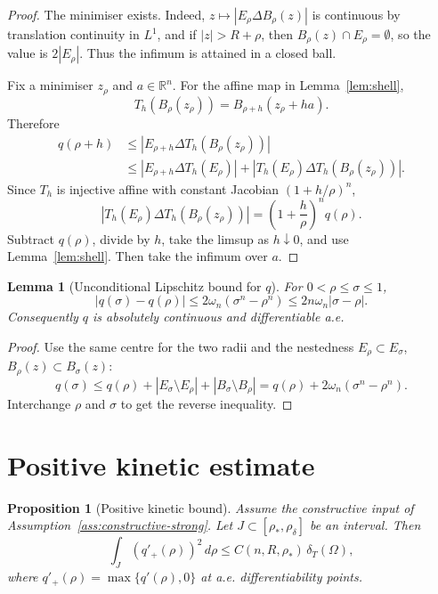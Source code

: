 \documentclass[11pt]{amsart}
\newtheorem{proposition}[theorem]{Proposition}
\newtheorem{lemma}[theorem]{Lemma}
\theoremstyle{definition}
\newcommand{\R}{\mathbb R}
\newcommand{\Om}{\Omega}
\newcommand{\dT}{\delta_T}
\newcommand{\rstar}{\rho_*}
\newcommand{\rdel}{\rho_\delta}
\begin{document}
\begin{proof}
The minimiser exists.  Indeed, \(z\mapsto |E_\rho\Delta B_\rho(z)|\) is
continuous by translation continuity in \(L^1\), and if
\(|z|>R+\rho\), then \(B_\rho(z)\cap E_\rho=\emptyset\), so the value is
\(2|E_\rho|\).  Thus the infimum is attained in a closed ball.

Fix a minimiser \(z_\rho\) and \(a\in\R^n\).  For the affine map in
Lemma~\ref{lem:shell},
\[
   T_h(B_\rho(z_\rho))=B_{\rho+h}(z_\rho+ha).
\]
Therefore
\[
\begin{aligned}
   q(\rho+h)
   &\le |E_{\rho+h}\Delta T_h(B_\rho(z_\rho))|\\
   &\le |E_{\rho+h}\Delta T_h(E_\rho)|
      +|T_h(E_\rho)\Delta T_h(B_\rho(z_\rho))|.
\end{aligned}
\]
Since \(T_h\) is injective affine with constant Jacobian
\((1+h/\rho)^n\),
\[
   |T_h(E_\rho)\Delta T_h(B_\rho(z_\rho))|
   =
   \left(1+\frac h\rho\right)^n q(\rho).
\]
Subtract \(q(\rho)\), divide by \(h\), take the limsup as \(h\downarrow0\),
and use Lemma~\ref{lem:shell}.  Then take the infimum over \(a\).
\end{proof}

\begin{lemma}[Unconditional Lipschitz bound for \(q\)]\label{lem:qLip}
For \(0<\rho\le\sigma\le1\),
\[
   |q(\sigma)-q(\rho)|
   \le 2\omega_n(\sigma^n-\rho^n)
   \le 2n\omega_n|\sigma-\rho|.
\]
Consequently \(q\) is absolutely continuous and differentiable a.e.
\end{lemma}

\begin{proof}
Use the same centre for the two radii and the nestedness
\(E_\rho\subset E_\sigma\), \(B_\rho(z)\subset B_\sigma(z)\):
\[
   q(\sigma)\le q(\rho)+|E_\sigma\setminus E_\rho|
                         +|B_\sigma\setminus B_\rho|
   =q(\rho)+2\omega_n(\sigma^n-\rho^n).
\]
Interchange \(\rho\) and \(\sigma\) to get the reverse inequality.
\end{proof}

\section{Positive kinetic estimate}\label{sec:kinetic}

\begin{proposition}[Positive kinetic bound]
\label{prop:positivekinetic}
Assume the constructive input of Assumption~\ref{ass:constructive-strong}.  Let
\(J\subset[\rstar,\rdel]\) be an interval.  Then
\[
   \int_J (q'_+(\rho))^2\,d\rho
   \le C(n,R,\rstar)\,\dT(\Om),
\]
where \(q'_+(\rho)=\max\{q'(\rho),0\}\) at a.e. differentiability points.
\end{proposition}
\end{document}
